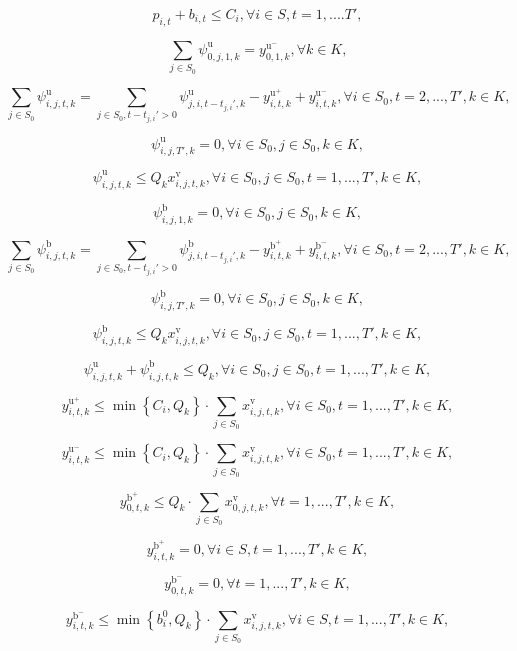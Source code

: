 \documentclass[
  english,
]{article}
\begin{document}
\begin{otherlanguage}{english}
\[\tag{7}p_{i,t} + b_{i,t} \leq C_{i},\forall i \in S,t = 1,....T',\]

\[\tag{8}\sum\limits_{j \in S_{0}}\psi_{0,j,1,k}^{\text{u}} = y_{0,1,k}^{\text{u}^{-}},\forall k \in K,\]

\[\tag{9}\sum\limits_{j \in S_{0}}\psi_{i,j,t,k}^{\text{u}} = \sum\limits_{j \in S_{0},t - t_{j,i}' > 0}\psi_{j,i,t - t_{j,i}',k}^{\text{u}} - y_{i,t,k}^{\text{u}^{+}} + y_{i,t,k}^{\text{u}^{-}},\forall i \in S_{0},t = 2,...,T',k \in K,\]

\[\tag{10}\psi_{i,j,T',k}^{\text{u}} = 0,\forall i \in S_{0},j \in S_{0},k \in K,\]

\[\tag{11}\psi_{i,j,t,k}^{\text{u}} \leq Q_{k}x_{i,j,t,k}^{\text{v}},\forall i \in S_{0},j \in S_{0},t = 1,...,T',k \in K,\]

\[\tag{12}\psi_{i,j,1,k}^{\text{b}} = 0,\forall i \in S_{0},j \in S_{0},k \in K,\]

\[\tag{13}\sum\limits_{j \in S_{0}}\psi_{i,j,t,k}^{\text{b}} = \sum\limits_{j \in S_{0},t - t_{j,i}' > 0}\psi_{j,i,t - t_{j,i}',k}^{\text{b}} - y_{i,t,k}^{\text{b}^{+}} + y_{i,t,k}^{\text{b}^{-}},\forall i \in S_{0},t = 2,...,T',k \in K,\]

\[\tag{14}\psi_{i,j,T',k}^{\text{b}} = 0,\forall i \in S_{0},j \in S_{0},k \in K,\]

\[\tag{15}\psi_{i,j,t,k}^{\text{b}} \leq Q_{k}x_{i,j,t,k}^{\text{v}},\forall i \in S_{0},j \in S_{0},t = 1,...,T',k \in K,\]

\[\tag{16}\psi_{i,j,t,k}^{\text{u}} + \psi_{i,j,t,k}^{\text{b}} \leq Q_{k},\forall i \in S_{0},j \in S_{0},t = 1,...,T',k \in K,\]

\[\tag{17}y_{i,t,k}^{\text{u}^{+}} \leq \min\left\{ {C_{i},Q_{k}} \right\} \cdot \sum\limits_{j \in S_{0}}x_{i,j,t,k}^{\text{v}},\forall i \in S_{0},t = 1,...,T',k \in K,\]

\[\tag{18}y_{i,t,k}^{\text{u}^{-}} \leq \min\left\{ {C_{i},Q_{k}} \right\} \cdot \sum\limits_{j \in S_{0}}x_{i,j,t,k}^{\text{v}},\forall i \in S_{0},t = 1,...,T',k \in K,\]

\[\tag{19}y_{0,t,k}^{\text{b}^{+}} \leq Q_{k} \cdot \sum\limits_{j \in S_{0}}x_{0,j,t,k}^{\text{v}},\forall t = 1,...,T',k \in K,\]

\[\tag{20}y_{i,t,k}^{\text{b}^{+}} = 0,\forall i \in S,t = 1,...,T',k \in K,\]

\[\tag{21}y_{0,t,k}^{\text{b}^{-}} = 0,\forall t = 1,...,T',k \in K,\]

\[\tag{22}y_{i,t,k}^{\text{b}^{-}} \leq \min\left\{ {b_{i}^{0},Q_{k}} \right\} \cdot \sum\limits_{j \in S_{0}}x_{i,j,t,k}^{\text{v}},\forall i \in S,t = 1,...,T',k \in K,\]


\end{otherlanguage}
\end{document}
